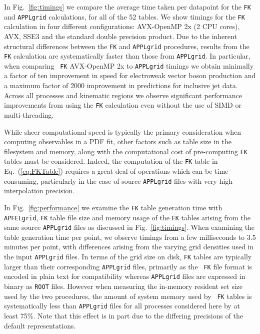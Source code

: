 \documentclass[preprint,12pt]{elsarticle}
\begin{document}
In Fig.~\ref{fig:timings} we compare the average time taken per
datapoint for the {\tt FK} and {\tt APPLgrid} calculations, for all of
the 52 tables. We show timings for the {\tt FK} calculation in four
different configurations: AVX-OpenMP 2x (2 CPU cores), AVX, SSE3 and
the standard double precision product. Due to the inherent structural
differences between the {\tt FK} and {\tt APPLgrid} procedures,
results from the {\tt FK} calculation are systematically faster than
those from {\tt APPLgrid}. In particular, when comparing {\tt
  FK} AVX-OpenMP 2x to {\tt APPLgrid} timings we obtain minimally a factor of
ten improvement in speed for electroweak vector boson production and a
maximum factor of 2000 improvement in predictions for inclusive jet
data. Across all processes and kinematic regions we observe
significant performance improvements from using the {\tt FK}
calculation even without the use of SIMD or multi-threading.

While sheer computational speed is typically the primary consideration
when com\-pu\-ting observables in a PDF fit, other factors such as
table size in the filesystem and memory, along with the computational
cost of pre-computing {\tt FK} tables must be considered. Indeed, the
computation of the {\tt FK} table in Eq.~(\ref{eq:FKTable}) requires a
great deal of operations which can be time consuming, particularly in
the case of source {\tt APPLgrid} files with very high interpolation
precision.

In Fig.~\ref{fig:performance} we examine the {\tt FK} table generation
time with {\tt APFELgrid}, {\tt FK} table file size and memory usage
of the {\tt FK} tables arising from the same source {\tt APPLgrid}
files as discussed in Fig.~\ref{fig:timings}. When examining the
table generation time per point, we observe timings from a few
milliseconds to 3.5 minutes per point, with differences arising from
the varying grid densities used in the input {\tt APPLgrid} files.  In
terms of the grid size on disk, {\tt FK} tables are typically larger
than their corresponding {\tt APPLgrid} files, primarily as the {\tt
  FK} file format is encoded in plain text for compatibility whereas
{\tt APPLgrid} files are expressed in binary as {\tt ROOT}
files. However when measuring the in-memory resident set size used by
the two procedures, the amount of system memory used by {\tt
  FK} tables is systematically less than {\tt APPLgrid} files for all
processes considered here by at least 75\%. Note that this effect is
in part due to the differing precisions of the default representations.
\end{document}
